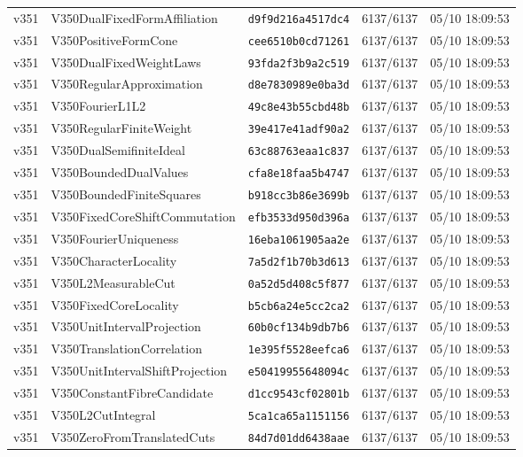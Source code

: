 \documentclass[11pt]{article}
\theoremstyle{definition}\newtheorem{deriv}{Derivation}
\begin{document}
{\begin{longtable}{@{}lllll@{}}
v351 & V350DualFixedFormAffiliation & \texttt{d9f9d216a4517dc4} & 6137/6137 & 05/10 18:09:53 \\
v351 & V350PositiveFormCone & \texttt{cee6510b0cd71261} & 6137/6137 & 05/10 18:09:53 \\
v351 & V350DualFixedWeightLaws & \texttt{93fda2f3b9a2c519} & 6137/6137 & 05/10 18:09:53 \\
v351 & V350RegularApproximation & \texttt{d8e7830989e0ba3d} & 6137/6137 & 05/10 18:09:53 \\
v351 & V350FourierL1L2 & \texttt{49c8e43b55cbd48b} & 6137/6137 & 05/10 18:09:53 \\
v351 & V350RegularFiniteWeight & \texttt{39e417e41adf90a2} & 6137/6137 & 05/10 18:09:53 \\
v351 & V350DualSemifiniteIdeal & \texttt{63c88763eaa1c837} & 6137/6137 & 05/10 18:09:53 \\
v351 & V350BoundedDualValues & \texttt{cfa8e18faa5b4747} & 6137/6137 & 05/10 18:09:53 \\
v351 & V350BoundedFiniteSquares & \texttt{b918cc3b86e3699b} & 6137/6137 & 05/10 18:09:53 \\
v351 & V350FixedCoreShiftCommutation & \texttt{efb3533d950d396a} & 6137/6137 & 05/10 18:09:53 \\
v351 & V350FourierUniqueness & \texttt{16eba1061905aa2e} & 6137/6137 & 05/10 18:09:53 \\
v351 & V350CharacterLocality & \texttt{7a5d2f1b70b3d613} & 6137/6137 & 05/10 18:09:53 \\
v351 & V350L2MeasurableCut & \texttt{0a52d5d408c5f877} & 6137/6137 & 05/10 18:09:53 \\
v351 & V350FixedCoreLocality & \texttt{b5cb6a24e5cc2ca2} & 6137/6137 & 05/10 18:09:53 \\
v351 & V350UnitIntervalProjection & \texttt{60b0cf134b9db7b6} & 6137/6137 & 05/10 18:09:53 \\
v351 & V350TranslationCorrelation & \texttt{1e395f5528eefca6} & 6137/6137 & 05/10 18:09:53 \\
v351 & V350UnitIntervalShiftProjection & \texttt{e50419955648094c} & 6137/6137 & 05/10 18:09:53 \\
v351 & V350ConstantFibreCandidate & \texttt{d1cc9543cf02801b} & 6137/6137 & 05/10 18:09:53 \\
v351 & V350L2CutIntegral & \texttt{5ca1ca65a1151156} & 6137/6137 & 05/10 18:09:53 \\
v351 & V350ZeroFromTranslatedCuts & \texttt{84d7d01dd6438aae} & 6137/6137 & 05/10 18:09:53 \\

\end{longtable}}
\end{document}
